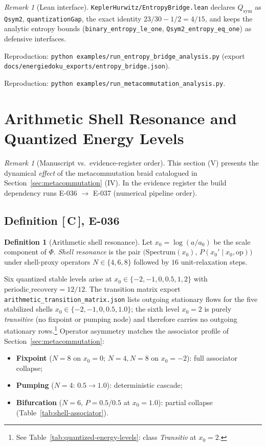 \documentclass[11pt, lettersize, article]{article}
\theoremstyle{definition}
\newtheorem{definition}[theorem]{Definition}
\theoremstyle{remark}
\newtheorem{remark}[theorem]{Remark}
\newcommand{\evidence}[1]{\textnormal{[\,#1\,]}}
\newcommand{\PhiMap}{\Phi}
\begin{document}
\begin{remark}[Lean interface]
\texttt{KeplerHurwitz/EntropyBridge.lean} declares $Q_{\mathrm{sym}}$ as \texttt{Qsym2},
\texttt{quantizationGap}, the exact identity $23/30-1/2=4/15$, and keeps the analytic entropy
bounds (\texttt{binary\_entropy\_le\_one}, \texttt{Qsym2\_entropy\_eq\_one}) as defensive interfaces.
\end{remark}

Reproduction: \texttt{python examples/run\_entropy\_bridge\_analysis.py}
(export \texttt{docs/energiedoku\_exports/entropy\_bridge.json}).

Reproduction: \texttt{python examples/run\_metacommutation\_analysis.py}.

\section{Arithmetic Shell Resonance and Quantized Energy Levels}
\label{sec:shell-resonance}

\begin{remark}[Manuscript vs.\ evidence-register order]
This section (V) presents the dynamical \emph{effect} of the metacommutation braid catalogued in Section~\ref{sec:metacommutation} (IV).
In the evidence register the build dependency runs E-036 $\to$ E-037 (numerical pipeline order).
\end{remark}

\subsection{Definition \evidence{C}, E-036}

\begin{definition}[Arithmetic shell resonance]
Let $x_0 = \log(a/a_0)$ be the scale component of $\PhiMap$.
\emph{Shell resonance} is the pair $\bigl(\mathrm{Spectrum}(x_0),\, P(x_0' \mid x_0, \mathrm{op})\bigr)$ under shell-proxy operators $N\in\{4,6,8\}$ followed by $16$ unit-relaxation steps.
\end{definition}

Six quantized stable levels arise at $x_0 \in \{-2,-1,0,0.5,1,2\}$ with $\mathrm{periodic\_recovery}=12/12$.
The transition matrix export \texttt{arithmetic\_transition\_matrix.json} lists outgoing stationary flows for the five stabilized shells
$x_0\in\{-2,-1,0,0.5,1.0\}$; the sixth level $x_0=2$ is purely \emph{transitive} (no fixpoint or pumping node) and therefore carries no outgoing stationary rows.\footnote{See Table~\ref{tab:quantized-energy-levels}: class \emph{Transitiv} at $x_0=2$.}
Operator asymmetry matches the associator profile of Section~\ref{sec:metacommutation}:
\begin{itemize}
  \item \textbf{Fixpoint} ($N=8$ on $x_0=0$; $N=4,N=8$ on $x_0=-2$): full associator collapse;
  \item \textbf{Pumping} ($N=4$: $0.5 \to 1.0$): deterministic cascade;
  \item \textbf{Bifurcation} ($N=6$, $P=0.5/0.5$ at $x_0=1.0$): partial collapse (Table~\ref{tab:shell-associator}).
\end{itemize}
\end{document}
